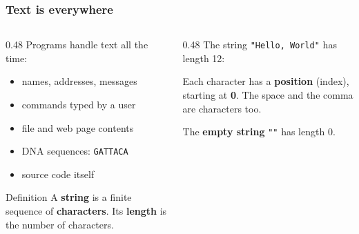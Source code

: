 \documentclass[aspectratio=169,10pt,compress]{beamer}
\begin{document}
\begin{frame}[t,fragile] \frametitle{Text is everywhere}
  \begin{columns}[T]
    \begin{column}{0.48\textwidth}
      Programs handle text all the time:
      \begin{itemize}\small
        \item names, addresses, messages
        \item commands typed by a user
        \item file and web page contents
        \item DNA sequences: \texttt{GATTACA}
        \item source code itself
      \end{itemize}
      \begin{block}{Definition}
        \small A \textbf{string} is a finite sequence of \textbf{characters}.
        Its \textbf{length} is the number of characters.
      \end{block}
    \end{column}
    \begin{column}{0.48\textwidth}
      The string \texttt{"Hello, World"} has length 12:
      \vspace{0.6em}


      \vspace{0.6em}
      \small Each character has a \textbf{position} (index), starting at \textbf{0}.
      The space and the comma are characters too.

      \vspace{0.4em}
      The \textbf{empty string} \texttt{""} has length 0.
    \end{column}
  \end{columns}
\end{frame}
\end{document}

